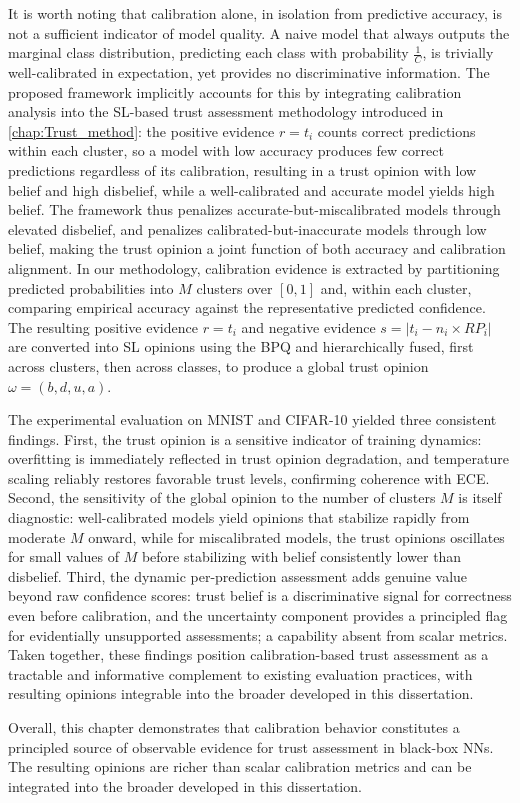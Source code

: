 It is worth noting that calibration alone, in isolation from predictive accuracy, is not a sufficient indicator of model quality. A naive model that always outputs the marginal class distribution, predicting each class with probability $\frac{1}{C}$, is trivially well-calibrated in expectation, yet provides no discriminative information. The proposed framework implicitly accounts for this by integrating calibration analysis into the \ac{SL}-based trust assessment methodology introduced in \cref{chap:Trust_method}: the positive evidence $r = t_i$ counts correct predictions within each cluster, so a model with low accuracy produces few correct predictions regardless of its calibration, resulting in a trust opinion with low belief and high disbelief, while a well-calibrated and accurate model yields high belief. The framework thus penalizes accurate-but-miscalibrated models through elevated disbelief, and penalizes calibrated-but-inaccurate models through low belief, making the trust opinion a joint function of both accuracy and calibration alignment. In our methodology, calibration evidence is extracted by partitioning predicted probabilities into $M$ clusters over $[0,1]$ and, within each cluster, comparing empirical accuracy against the representative predicted confidence. The resulting positive evidence $r = t_i$ and negative evidence $s = |t_i - n_i \times RP_i|$ are converted into \ac{SL} opinions using the \ac{BPQ} and hierarchically fused, first across clusters, then across classes, to produce a global trust opinion $\omega = (b, d, u, a)$.

The experimental evaluation on MNIST and CIFAR-10 yielded three consistent findings. First, the trust opinion is a sensitive indicator of training dynamics: overfitting is immediately reflected in trust opinion degradation, and temperature scaling reliably restores favorable trust levels, confirming coherence with \ac{ECE}. Second, the sensitivity of the global opinion to the number of clusters $M$ is itself diagnostic: well-calibrated models yield opinions that stabilize rapidly from moderate $M$ onward, while for miscalibrated models, the trust opinions oscillates for small values of $M$ before stabilizing with belief consistently lower than disbelief. Third, the dynamic per-prediction assessment adds genuine value beyond raw confidence scores: trust belief is a discriminative signal for correctness even before calibration, and the uncertainty component provides a principled flag for evidentially unsupported assessments; a capability absent from scalar metrics. Taken together, these findings position calibration-based trust assessment as a tractable and informative complement to existing evaluation practices, with resulting opinions integrable into the broader  developed in this dissertation.

Overall, this chapter demonstrates that calibration behavior constitutes a principled source of observable evidence for trust assessment in black-box \acp{NN}. The resulting opinions are richer than scalar calibration metrics and can be integrated into the broader  developed in this dissertation.